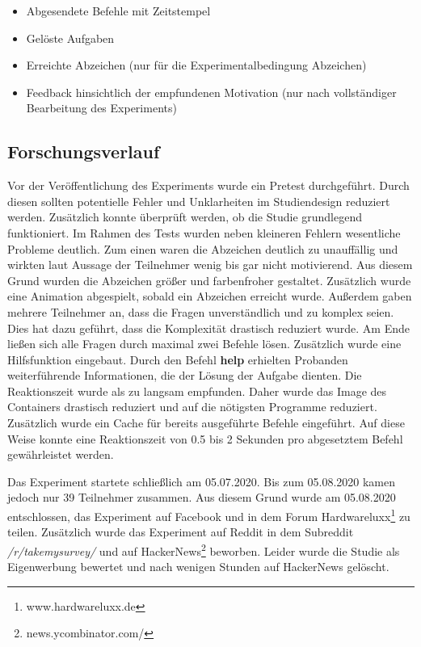 \begin{itemize}
	 \item Abgesendete Befehle mit Zeitstempel
	 \item Gelöste Aufgaben 
	 \item Erreichte Abzeichen (nur für die Experimentalbedingung Abzeichen)
	 \item Feedback hinsichtlich der empfundenen Motivation (nur nach vollständiger Bearbeitung des Experiments)
\end{itemize}


\subsection{Forschungsverlauf}
Vor der Veröffentlichung des Experiments wurde ein Pretest durchgeführt. Durch diesen sollten potentielle Fehler und Unklarheiten im Studiendesign reduziert werden. Zusätzlich konnte überprüft werden, ob die Studie grundlegend funktioniert. Im Rahmen des Tests wurden neben kleineren Fehlern wesentliche Probleme deutlich. Zum einen waren die Abzeichen deutlich zu unauffällig und wirkten laut Aussage der Teilnehmer wenig bis gar nicht motivierend. Aus diesem Grund wurden die Abzeichen größer und farbenfroher gestaltet. Zusätzlich wurde eine Animation abgespielt, sobald ein Abzeichen erreicht wurde. Außerdem gaben mehrere Teilnehmer an, dass die Fragen unverständlich und zu komplex seien. Dies hat dazu geführt, dass die Komplexität drastisch reduziert wurde. Am Ende ließen sich alle Fragen durch maximal zwei Befehle lösen. Zusätzlich wurde eine Hilfsfunktion eingebaut. Durch den Befehl \textbf{help} erhielten Probanden weiterführende Informationen, die der Lösung der Aufgabe dienten. Die Reaktionszeit wurde als zu langsam empfunden. Daher wurde das Image des Containers drastisch reduziert und auf die nötigsten Programme reduziert. Zusätzlich wurde ein Cache für bereits ausgeführte Befehle eingeführt. Auf diese Weise konnte eine Reaktionszeit von 0.5 bis 2 Sekunden pro abgesetztem Befehl gewährleistet werden.

Das Experiment startete schließlich am 05.07.2020. Bis zum 05.08.2020 kamen jedoch nur 39 Teilnehmer zusammen. Aus diesem Grund wurde am 05.08.2020 entschlossen, das Experiment auf Facebook und in dem Forum Hardwareluxx\footnote{www.hardwareluxx.de} zu teilen. Zusätzlich wurde das Experiment auf Reddit in dem Subreddit \textit{/r/takemysurvey/} und auf HackerNews\footnote{news.ycombinator.com/} beworben. Leider wurde die Studie als Eigenwerbung bewertet und nach wenigen Stunden auf HackerNews gelöscht. 

